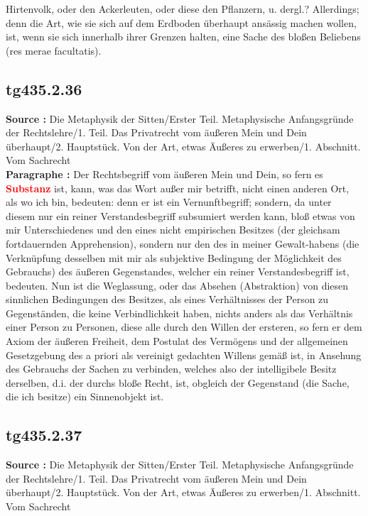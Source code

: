 \documentclass[a4paper,12pt,twoside]{book}
\newcommand{\match}[1]{\textcolor{red}{\textbf{#1}}}
\begin{document}
Hirtenvolk, oder den Ackerleuten, oder diese den Pflanzern, u. dergl.? Allerdings; denn die Art, wie sie sich auf dem Erdboden überhaupt ansässig machen wollen, ist, wenn sie sich innerhalb ihrer Grenzen halten, eine Sache des bloßen Beliebens (res merae facultatis). 
	
	\subsection*{tg435.2.36} 
	\textbf{Source : }Die Metaphysik der Sitten/Erster Teil. Metaphysische Anfangsgründe der Rechtslehre/1. Teil. Das Privatrecht vom äußeren Mein und Dein überhaupt/2. Hauptstück. Von der Art, etwas Äußeres zu erwerben/1. Abschnitt. Vom Sachrecht\\  
	
	\textbf{Paragraphe : }Der Rechtsbegriff vom äußeren Mein und Dein, so fern es \match{Substanz} ist, kann, was das Wort außer mir betrifft, nicht einen anderen Ort, als wo ich bin, bedeuten: denn er ist ein Vernunftbegriff; sondern, da unter diesem nur ein reiner Verstandesbegriff subsumiert werden kann, bloß etwas von mir Unterschiedenes und den eines nicht empirischen Besitzes (der gleichsam fortdauernden Apprehension), sondern nur den des in meiner Gewalt-habens (die Verknüpfung desselben mit mir als subjektive Bedingung der Möglichkeit des Gebrauchs) des äußeren Gegenstandes, welcher ein reiner Verstandesbegriff ist, bedeuten. Nun ist die Weglassung, oder das Absehen (Abstraktion) von diesen sinnlichen Bedingungen des Besitzes, als eines Verhältnisses der Person zu Gegenständen, die keine Verbindlichkeit haben, nichts anders als das Verhältnis einer Person zu Personen, diese alle durch den Willen der ersteren, so fern er dem Axiom der äußeren Freiheit, dem Postulat des Vermögens und der allgemeinen Gesetzgebung
	des a priori als vereinigt gedachten Willens gemäß ist, in Ansehung des Gebrauchs der Sachen zu verbinden, welches also der intelligibele Besitz derselben, d.i. der durchs bloße Recht, ist, obgleich der Gegenstand (die Sache, die ich besitze) ein Sinnenobjekt ist. 
	
	\subsection*{tg435.2.37} 
	\textbf{Source : }Die Metaphysik der Sitten/Erster Teil. Metaphysische Anfangsgründe der Rechtslehre/1. Teil. Das Privatrecht vom äußeren Mein und Dein überhaupt/2. Hauptstück. Von der Art, etwas Äußeres zu erwerben/1. Abschnitt. Vom Sachrecht\\  
	
\end{document}

